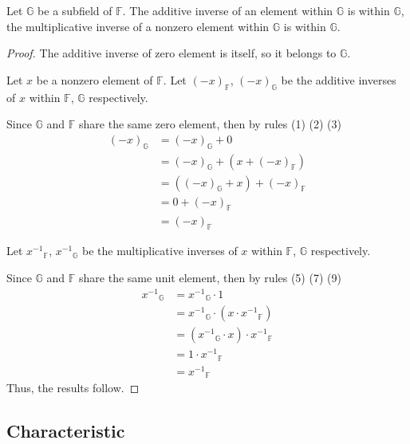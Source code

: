 \begin{theorem}
	Let $\mathbb{G}$ be a subfield of $\mathbb{F}$. The additive inverse of an element within $\mathbb{G}$ is within $\mathbb{G}$, the multiplicative inverse of a nonzero element within $\mathbb{G}$ is within $\mathbb{G}$.
\end{theorem}

\begin{proof}
	The additive inverse of zero element is itself, so it belongs to $\mathbb{G}$.

	Let $x$ be a nonzero element of $\mathbb{F}$. Let ${(-x)}_{\mathbb{F}}$, ${(-x)}_{\mathbb{G}}$ be the additive inverses of $x$ within $\mathbb{F}$, $\mathbb{G}$ respectively.

	Since $\mathbb{G}$ and $\mathbb{F}$ share the same zero element, then by rules (1) (2) (3)
	\begin{align*}
		{(-x)}_{\mathbb{G}} & = {(-x)}_{\mathbb{G}} + 0                         \\
		                    & = {(-x)}_{\mathbb{G}} + (x + {(-x)}_{\mathbb{F}}) \\
		                    & = ({(-x)}_{\mathbb{G}} + x) + {(-x)}_{\mathbb{F}} \\
		                    & = 0 + {(-x)}_{\mathbb{F}}                         \\
		                    & = {(-x)}_{\mathbb{F}}
	\end{align*}

	Let ${x^{-1}}_{\mathbb{F}}$, ${x^{-1}}_{\mathbb{G}}$ be the multiplicative inverses of $x$ within $\mathbb{F}$, $\mathbb{G}$ respectively.

	Since $\mathbb{G}$ and $\mathbb{F}$ share the same unit element, then by rules (5) (7) (9)
	\begin{align*}
		{x^{-1}}_{\mathbb{G}} & = {x^{-1}}_{\mathbb{G}}\cdot 1                              \\
		                      & = {x^{-1}}_{\mathbb{G}}\cdot (x\cdot {x^{-1}}_{\mathbb{F}}) \\
		                      & = ({x^{-1}}_{\mathbb{G}}\cdot x)\cdot {x^{-1}}_{\mathbb{F}} \\
		                      & = 1\cdot {x^{-1}}_{\mathbb{F}}                              \\
		                      & = {x^{-1}}_{\mathbb{F}}
	\end{align*}
	Thus, the results follow.
\end{proof}

\subsection{Characteristic}

